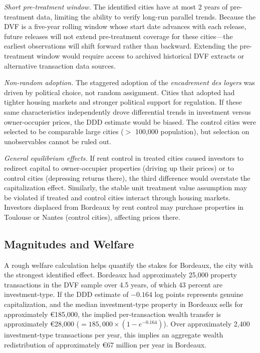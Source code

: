\documentclass[12pt]{article}
\begin{document}
\emph{Short pre-treatment window.} The identified cities have at most 2 years of pre-treatment data, limiting the ability to verify long-run parallel trends. Because the DVF is a five-year rolling window whose start date advances with each release, future releases will not extend pre-treatment coverage for these cities---the earliest observations will shift forward rather than backward. Extending the pre-treatment window would require access to archived historical DVF extracts or alternative transaction data sources.

\emph{Non-random adoption.} The staggered adoption of the \emph{encadrement des loyers} was driven by political choice, not random assignment. Cities that adopted had tighter housing markets and stronger political support for regulation. If these same characteristics independently drove differential trends in investment versus owner-occupier prices, the DDD estimate would be biased. The control cities were selected to be comparable large cities ($>$ 100,000 population), but selection on unobservables cannot be ruled out.

\emph{General equilibrium effects.} If rent control in treated cities caused investors to redirect capital to owner-occupier properties (driving up their prices) or to control cities (depressing returns there), the third difference would overstate the capitalization effect. Similarly, the stable unit treatment value assumption may be violated if treated and control cities interact through housing markets. Investors displaced from Bordeaux by rent control may purchase properties in Toulouse or Nantes (control cities), affecting prices there.

\subsection{Magnitudes and Welfare}

A rough welfare calculation helps quantify the stakes for Bordeaux, the city with the strongest identified effect. Bordeaux had approximately 25,000 property transactions in the DVF sample over 4.5 years, of which 43 percent are investment-type. If the DDD estimate of $-0.164$ log points represents genuine capitalization, and the median investment-type property in Bordeaux sells for approximately \euro{185,000}, the implied per-transaction wealth transfer is approximately \euro{28,000} ($= 185{,}000 \times (1 - e^{-0.164})$). Over approximately 2,400 investment-type transactions per year, this implies an aggregate wealth redistribution of approximately \euro{67} million per year in Bordeaux.
\end{document}
